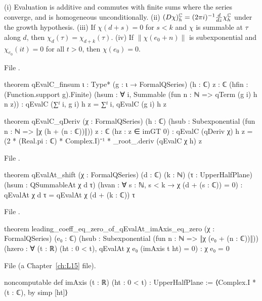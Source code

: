 \begin{theorem}\label{l14:thm:qevallin}
(i) Evaluation is additive and commutes with finite sums where the series converge, and is homogeneous unconditionally.
(ii) $(D\chi)^{{\mathbb{C}}}_h = (2\pi i)^{-1}\frac{d}{dz}\chi^{{\mathbb{C}}}_h$ under the growth hypothesis.
(iii) If $\chi(d+s) = 0$ for $s<k$ and $\chi$ is summable at $\tau$ along $d$, then $\chi_d(\tau) = \chi_{d+k}(\tau)$.
(iv) If $\|\chi(e_0+n)\|$ is subexponential and $\chi_{e_0}(it) = 0$ for all $t>0$, then $\chi(e_0) = 0$.
\end{theorem}
\noindent File .
\begin{leancode}
theorem qEvalC_finsum {ι : Type*} (g : ι → FormalQSeries) (h : ℂ) {z : ℂ}
    (hfin : (Function.support g).Finite)
    (hsum : ∀ i, Summable (fun n : ℕ => qTerm (g i) h n z)) :
    qEvalC (∑ᶠ i, g i) h z = ∑ᶠ i, qEvalC (g i) h z

theorem qEvalC_qDeriv (χ : FormalQSeries) (h : ℂ)
    (hsub : Subexponential (fun n : ℕ => ‖χ (h + (n : ℂ))‖)) {z : ℂ} (hz : z ∈ imGT 0) :
    qEvalC (qDeriv χ) h z
      = (2 * (Real.pi : ℂ) * Complex.I)⁻¹ * _root_.deriv (qEvalC χ h) z
\end{leancode}
\noindent File .
\begin{leancode}
theorem qEvalAt_shift (χ : FormalQSeries) (d : ℂ) (k : ℕ) (τ : UpperHalfPlane)
    (hsum : QSummableAt χ d τ) (hvan : ∀ s : ℕ, s < k → χ (d + (s : ℂ)) = 0) :
    qEvalAt χ d τ = qEvalAt χ (d + (k : ℂ)) τ
\end{leancode}
\noindent File .
\begin{leancode}
theorem leading_coeff_eq_zero_of_qEvalAt_imAxis_eq_zero (χ : FormalQSeries) (e₀ : ℂ)
    (hsub : Subexponential (fun n : ℕ => ‖χ (e₀ + (n : ℂ))‖))
    (hzero : ∀ (t : ℝ) (ht : 0 < t), qEvalAt χ e₀ (imAxis t ht) = 0) :
    χ e₀ = 0
\end{leancode}
\noindent File  (a Chapter~\ref{ch:L15} file).
\begin{leancode}
noncomputable def imAxis (t : ℝ) (ht : 0 < t) : UpperHalfPlane :=
  ⟨Complex.I * (t : ℂ), by simp [ht]⟩
\end{leancode}
